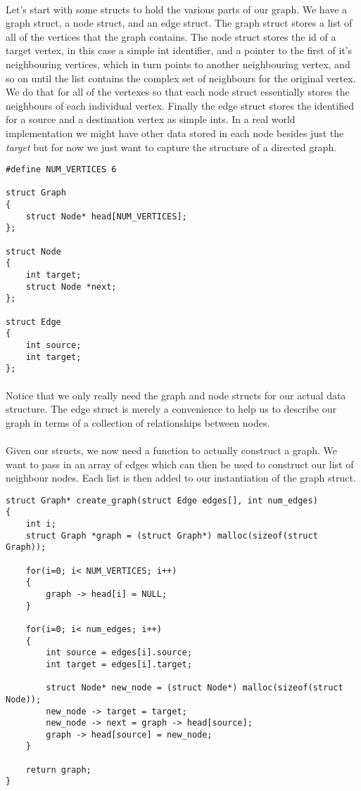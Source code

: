 \documentclass[10pt, a4paper, twosize]{article}
\begin{document}
\paragraph{} Let's start with some structs to hold the various parts of our graph. We have a graph struct, a node struct, and an edge struct. The graph struct stores a list of all of the vertices that the graph contains. The node struct stores the id of a target vertex, in this case a simple int identifier, and a pointer to the first of it's neighbouring vertices, which in turn points to another neighbouring vertex, and so on until the list contains the complex set of neighbours for the original vertex. We do that for all of the vertexes so that each node struct essentially stores the neighbours of each individual vertex. Finally the edge struct stores the identified for a source and a destination vertex as simple ints. In a real world implementation we might have other data stored in each node besides just the \emph{target} but for now we just want to capture the structure of a directed graph.

\begin{lstlisting}
#define NUM_VERTICES 6

struct Graph
{
    struct Node* head[NUM_VERTICES];
};

struct Node
{
    int target;
    struct Node *next;
};

struct Edge
{
    int source;
    int target;
};

\end{lstlisting}
\paragraph{} Notice that we only really need the graph and node structs for our actual data structure. The edge struct is merely a convenience to help us to describe our graph in terms of a collection of relationships between nodes.


\paragraph{} Given our structs, we now need a function to actually construct a graph. We want to pass in an array of edges which can then be used to construct our list of neighbour nodes. Each list is then added to our instantiation of the graph struct.
\begin{lstlisting}
struct Graph* create_graph(struct Edge edges[], int num_edges)
{
    int i;
    struct Graph *graph = (struct Graph*) malloc(sizeof(struct Graph));

    for(i=0; i< NUM_VERTICES; i++)
    {
        graph -> head[i] = NULL;
    }

    for(i=0; i< num_edges; i++)
    {
        int source = edges[i].source;
        int target = edges[i].target;

        struct Node* new_node = (struct Node*) malloc(sizeof(struct Node));
        new_node -> target = target;
        new_node -> next = graph -> head[source];
        graph -> head[source] = new_node;
    }

    return graph;
}
\end{lstlisting}
\end{document}
